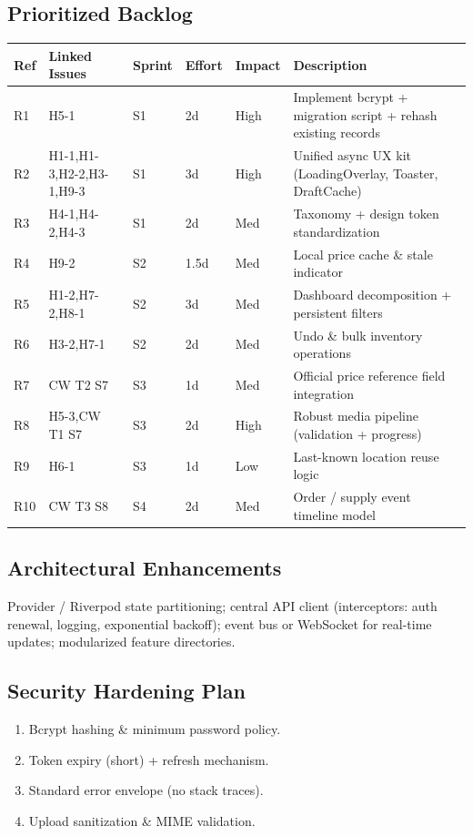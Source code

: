 \documentclass[11pt,a4paper]{article}
\begin{document}
\subsection{Prioritized Backlog}
\begin{longtable}{@{}L{0.7cm}L{3cm}L{0.9cm}L{1.3cm}L{1cm}L{7cm}@{}}
\toprule
\textbf{Ref} & \textbf{Linked Issues} & \textbf{Sprint} & \textbf{Effort} & \textbf{Impact} & \textbf{Description}\\\midrule
R1 & H5-1 & S1 & 2d & High & Implement bcrypt + migration script + rehash existing records \\
R2 & H1-1,H1-3,H2-2,H3-1,H9-3 & S1 & 3d & High & Unified async UX kit (LoadingOverlay, Toaster, DraftCache) \\
R3 & H4-1,H4-2,H4-3 & S1 & 2d & Med & Taxonomy + design token standardization \\
R4 & H9-2 & S2 & 1.5d & Med & Local price cache \& stale indicator \\
R5 & H1-2,H7-2,H8-1 & S2 & 3d & Med & Dashboard decomposition + persistent filters \\
R6 & H3-2,H7-1 & S2 & 2d & Med & Undo \& bulk inventory operations \\
R7 & CW T2 S7 & S3 & 1d & Med & Official price reference field integration \\
R8 & H5-3,CW T1 S7 & S3 & 2d & High & Robust media pipeline (validation + progress) \\
R9 & H6-1 & S3 & 1d & Low & Last-known location reuse logic \\
R10 & CW T3 S8 & S4 & 2d & Med & Order / supply event timeline model \\
\bottomrule
\end{longtable}

\subsection{Architectural Enhancements}
Provider / Riverpod state partitioning; central API client (interceptors: auth renewal, logging, exponential backoff); event bus or WebSocket for real-time updates; modularized feature directories.

\subsection{Security Hardening Plan}
\begin{enumerate}[leftmargin=*]
  \item Bcrypt hashing \& minimum password policy.
  \item Token expiry (short) + refresh mechanism.
  \item Standard error envelope (no stack traces).
  \item Upload sanitization \& MIME validation.
\end{enumerate}
\end{document}
